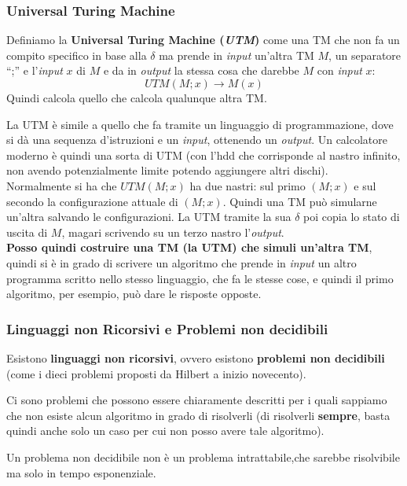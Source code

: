 \subsubsection{Universal Turing Machine}
\begin{definizione}
  Definiamo la \textbf{Universal Turing Machine (\textit{UTM})} come una TM che
  non fa un compito specifico in base alla $\delta$ ma prende in \textit{input} un'altra
  TM $M$, un separatore ``;'' e l'\textit{input} $x$ di $M$ e da in \textit{output} la stessa cosa
  che darebbe $M$ con \textit{input} $x$:
  \[UTM(M;x)\to M(x)\]
  Quindi calcola quello che calcola qualunque altra TM.
\end{definizione}
La UTM è simile a quello che fa tramite un linguaggio di programmazione, dove si dà una sequenza d'istruzioni e un \textit{input}, ottenendo un \textit{output}. Un calcolatore moderno è quindi una sorta di UTM (con l'hdd che corrisponde al nastro infinito, non avendo potenzialmente limite potendo aggiungere altri dischi).\\ Normalmente si ha che $UTM(M;x)$ ha due nastri: sul primo $(M;x)$ e sul secondo la configurazione attuale di $(M;x)$. Quindi una TM può simularne un'altra salvando le configurazioni. La UTM tramite la sua $\delta$ poi copia lo stato di uscita di $M$, magari scrivendo su un terzo nastro l'\textit{output}.\\ \textbf{Posso quindi costruire una TM (la UTM) che simuli un'altra TM}, quindi si è in grado di scrivere un algoritmo che prende in \textit{input} un altro programma scritto nello stesso linguaggio, che fa le stesse cose, e quindi il primo algoritmo, per esempio, può dare le risposte opposte.\\
\subsubsection{Linguaggi non Ricorsivi e Problemi non decidibili}
\begin{definizione}
  Esistono \textbf{linguaggi non ricorsivi}, ovvero esistono \textbf{problemi non decidibili} (come i dieci problemi proposti da Hilbert a inizio novecento).
\end{definizione}
Ci sono problemi che possono essere chiaramente descritti per i quali sappiamo
che non esiste alcun algoritmo in grado di risolverli (di risolverli
\textbf{sempre}, basta quindi anche solo un caso per cui non posso avere tale algoritmo). 
\begin{definizione}
  Un problema non decidibile non è un problema intrattabile,che sarebbe risolvibile ma solo in tempo esponenziale.
\end{definizione}
